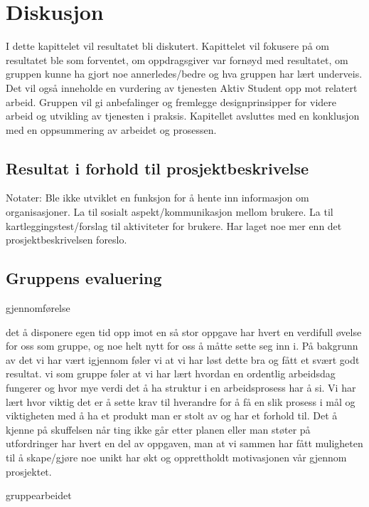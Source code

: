 \cleardoublepage
\chapter{Diskusjon}
\label{chap:discussion} 

I dette kapittelet vil resultatet bli diskutert. Kapittelet vil fokusere på om resultatet ble som forventet, om oppdragsgiver var fornøyd med resultatet, om gruppen kunne ha gjort noe annerledes/bedre og hva gruppen har lært underveis. Det vil også inneholde en vurdering av tjenesten Aktiv Student opp mot relatert arbeid. Gruppen vil gi anbefalinger og fremlegge designprinsipper for videre arbeid og utvikling av tjenesten i praksis. Kapitellet avsluttes med en konklusjon med en oppsummering av arbeidet og prosessen.

\section{Resultat i forhold til prosjektbeskrivelse}
Notater:
Ble ikke utviklet en funksjon for å hente inn informasjon om organisasjoner.
La til sosialt aspekt/kommunikasjon mellom brukere.
La til kartleggingstest/forslag til aktiviteter for brukere.
Har laget noe mer enn det prosjektbeskrivelsen foreslo.

\section{Gruppens evaluering}

gjennomførelse 

det å disponere egen tid opp imot en så stor oppgave har hvert en verdifull øvelse for oss som gruppe, og noe helt nytt for oss å måtte sette seg inn i. På bakgrunn av det vi har vært igjennom føler vi at vi har løst dette bra og fått et svært godt resultat. vi som gruppe føler at vi har lært hvordan en ordentlig arbeidsdag fungerer og hvor mye verdi det å ha struktur i en arbeidsprosess har å si. Vi har lært hvor viktig det er å sette krav til hverandre for å få en slik prosess i mål og viktigheten med å ha et produkt man er stolt av og har et forhold til.
Det å kjenne på skuffelsen når ting ikke går etter planen eller man støter på utfordringer har hvert en del av oppgaven, man at vi sammen har fått muligheten til å skape/gjøre noe unikt har økt og opprettholdt motivasjonen vår gjennom prosjektet.

gruppearbeidet

